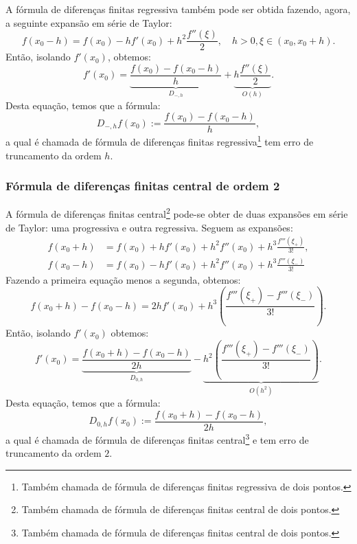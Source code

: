 A fórmula de diferenças finitas regressiva também pode ser obtida fazendo, agora, a seguinte expansão em série de Taylor:
\begin{equation*}
  f(x_0-h) = f(x_0) - hf'(x_0) + h^2\frac{f''(\xi)}{2},\quad h>0, \xi\in(x_0, x_0+h).
\end{equation*}
Então, isolando $f'(x_0)$, obtemos:
\begin{equation*}
  f'(x_0) = \underbrace{\frac{f(x_0) - f(x_0-h)}{h}}_{D_{-,h}} + \underbrace{h\frac{f''(\xi)}{2}}_{O(h)}.
\end{equation*}
Desta equação, temos que a fórmula:
\begin{equation*}
  D_{-,h}f(x_0) := \frac{f(x_0)-f(x_0-h)}{h},
\end{equation*}
a qual é chamada de fórmula de diferenças finitas regressiva\footnote{Também chamada de fórmula de diferenças finitas regressiva de dois pontos.} tem erro de truncamento da ordem $h$.

\subsubsection{Fórmula de diferenças finitas central de ordem 2}

A fórmula de diferenças finitas central\footnote{Também chamada de fórmula de diferenças finitas central de dois pontos.} pode-se obter de duas expansões em série de Taylor: uma progressiva e outra regressiva. Seguem as expansões:
\begin{equation*}
  \begin{split}
    f(x_0+h) &= f(x_0) + hf'(x_0) + h^2f''(x_0) + h^3\frac{f'''(\xi_{+})}{3!},\\
    f(x_0-h) &= f(x_0) - hf'(x_0) + h^2f''(x_0) + h^3\frac{f'''(\xi_{-})}{3!}
  \end{split}
\end{equation*}
Fazendo a primeira equação menos a segunda, obtemos:
\begin{equation*}
  f(x_0+h)-f(x_0-h) = 2hf'(x_0) + h^{3}\left(\frac{f'''(\xi_{+}) - f'''(\xi_{-})}{3!}\right).
\end{equation*}
Então, isolando $f'(x_0)$ obtemos:
\begin{equation*}
  f'(x_0) = \underbrace{\frac{f(x_0+h) - f(x_0-h)}{2h}}_{D_{0,h}} - \underbrace{h^2\left(\frac{f'''(\xi_+) - f'''(\xi_-)}{3!}\right)}_{O(h^2)}.
\end{equation*}
Desta equação, temos que a fórmula:
\begin{equation*}
  D_{0,h}f(x_0) := \frac{f(x_0+h)-f(x_0-h)}{2h},
\end{equation*}
a qual é chamada de fórmula de diferenças finitas central\footnote{Também chamada de fórmula de diferenças finitas central de dois pontos.} e tem erro de truncamento da ordem $2$.

